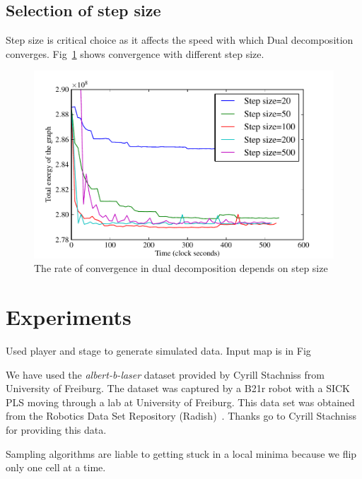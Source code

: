 \documentclass[letterpaper, 10 pt, conference]{ieeeconf} %
\begin{document}
\subsection{Selection of step size}
Step size is critical choice as it affects the speed with which Dual decomposition converges. Fig~\ref{fig:dualdecomposition-stepsize} shows convergence with different step size.
\begin{figure}
  \includegraphics[width=\columnwidth]{../figures/dualdecomposition-stepsize-inc500.pdf}
  \caption{The rate of convergence in dual decomposition depends on step size}
  \label{fig:dualdecomposition-stepsize}
\end{figure}

\section{Experiments} 
Used player and stage to generate simulated data. Input map is in Fig

We have used the \emph{albert-b-laser} dataset provided by Cyrill Stachniss from University of Freiburg. The dataset was captured by a B21r robot with a SICK PLS moving through a lab at University of Freiburg.
This data set was obtained from the Robotics Data Set
Repository (Radish)~\cite{howard2003radish}. Thanks go to Cyrill Stachniss for providing this data.

\begin{figure}
\end{figure}
Sampling algorithms are liable to getting stuck in a local minima because we flip only one cell at a time.
\end{document}
